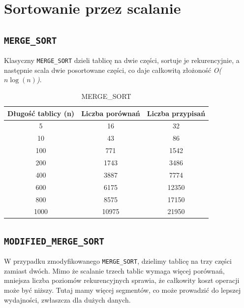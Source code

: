 \documentclass{article}
\begin{document}
\section{Sortowanie przez scalanie}

\subsection{\texttt{MERGE\_SORT}}
Klasyczny \texttt{MERGE\_SORT} dzieli tablicę na dwie części, sortuje je rekurencyjnie, a następnie scala dwie posortowane części, co daje całkowitą złożoność \emph{O($n \log(n)$)}.


\begin{table}[h!]
	\centering
	\small
	\begin{tabular}{|c|c|c|}
		\hline
		\textbf{Długość tablicy (n)} & \textbf{Liczba porównań} & \textbf{Liczba przypisań} \\ \hline
		5   & 16    & 32     \\ \hline
		10  & 43    & 86     \\ \hline
		100 & 771   & 1542   \\ \hline
		200 & 1743  & 3486   \\ \hline
		400 & 3887  & 7774   \\ \hline
		600 & 6175  & 12350  \\ \hline
		800 & 8575  & 17150  \\ \hline
		1000 & 10975 & 21950  \\ \hline
	\end{tabular}
	\caption{MERGE\_SORT}
\end{table}

\subsection{\texttt{MODIFIED\_MERGE\_SORT}}
 W przypadku zmodyfikowanego \texttt{MERGE\_SORT}, dzielimy tablicę na trzy części zamiast dwóch. Mimo że scalanie trzech tablic wymaga więcej porównań, mniejsza liczba poziomów rekurencyjnych sprawia, że całkowity koszt operacji  może być niższy. Tutaj mamy więcej segmentów, co może prowadzić do lepszej wydajności, zwłaszcza dla dużych danych.
\end{document}
